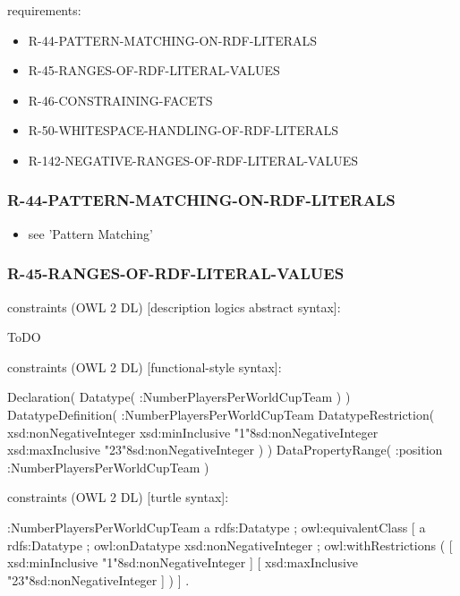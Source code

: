\documentclass{llncs}
\begin{document}
requirements:

\begin{itemize}
	\item R-44-PATTERN-MATCHING-ON-RDF-LITERALS
	\item R-45-RANGES-OF-RDF-LITERAL-VALUES
	\item R-46-CONSTRAINING-FACETS
	\item R-50-WHITESPACE-HANDLING-OF-RDF-LITERALS
	\item R-142-NEGATIVE-RANGES-OF-RDF-LITERAL-VALUES
\end{itemize}

\subsubsection{R-44-PATTERN-MATCHING-ON-RDF-LITERALS}

\begin{itemize}
	\item see 'Pattern Matching'
\end{itemize}

\subsubsection{R-45-RANGES-OF-RDF-LITERAL-VALUES}

constraints (OWL 2 DL) [description logics abstract syntax]:

\begin{ex}
ToDO
\end{ex}

constraints (OWL 2 DL) [functional-style syntax]:

\begin{ex}
Declaration( Datatype( :NumberPlayersPerWorldCupTeam ) ) 
DatatypeDefinition( 
    :NumberPlayersPerWorldCupTeam
    DatatypeRestriction( 
        xsd:nonNegativeInteger 
        xsd:minInclusive "1"^^xsd:nonNegativeInteger 
        xsd:maxInclusive "23"^^xsd:nonNegativeInteger ) )     
DataPropertyRange( :position :NumberPlayersPerWorldCupTeam ) 
\end{ex}

constraints (OWL 2 DL) [turtle syntax]:

\begin{ex}
:NumberPlayersPerWorldCupTeam
    a rdfs:Datatype ;
    owl:equivalentClass [
        a rdfs:Datatype ;
        owl:onDatatype xsd:nonNegativeInteger ;
        owl:withRestrictions ( 
            [ xsd:minInclusive "1"^^xsd:nonNegativeInteger ]
            [ xsd:maxInclusive "23"^^xsd:nonNegativeInteger ] ) ] .
\end{ex}
\end{document}
